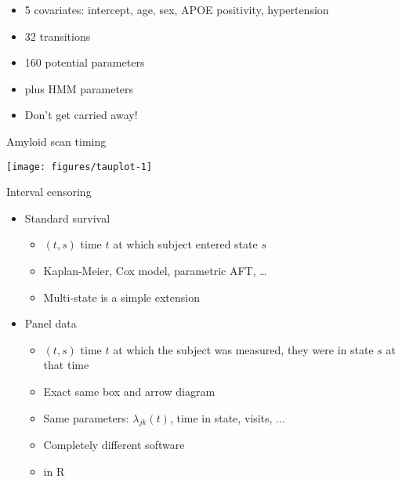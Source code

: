 \begin{frame}
  \begin{itemize}
    \item 5 covariates: intercept, age, sex, APOE positivity, hypertension
    \item 32 transitions
    \item 160 potential parameters
    \item plus HMM parameters
      \pause
    \item Don't get carried away!
  \end{itemize}
\end{frame}
 
\begin{frame}{Amyloid scan timing}
\begin{knitrout}
\color{fgcolor}
\texttt{[image: figures/tauplot-1]} 

\end{knitrout}
\end{frame}

\begin{frame}{Interval censoring}
  \begin{itemize}
    \item Standard survival
      \begin{itemize}
        \item $(t, s)$  time $t$ at which subject entered state $s$
        \item Kaplan-Meier, Cox model, parametric AFT, \ldots
        \item Multi-state is a simple extension
      \end{itemize}
    \item Panel data
      \begin{itemize}
        \item $(t, s)$ time $t$ at which the subject was measured, they
          were in state $s$ at that time
        \item Exact same box and arrow diagram
        \item Same parameters: $\lambda_{jk}(t)$, time in state, visits, ...
        \item Completely different software
        \item {} in R
      \end{itemize}
  \end{itemize}
\end{frame}

